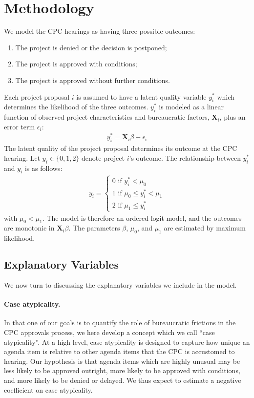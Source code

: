 \section{Methodology}\label{sec_methodology}

We model the CPC hearings as having three possible outcomes:
\begin{enumerate}[start=0]
\item The project is denied or the decision is postponed;
\item The project is approved with conditions;
\item The project is approved without further conditions.
\end{enumerate}
Each project proposal $i$ is assumed to have a latent quality variable $y_i^\ast$ which determines the likelihood of the three outcomes. $y_i^\ast$ is modeled as a linear function of observed project characteristics and bureaucratic factors, $\mathbf{X}_i$, plus an error term $\epsilon_i$:
\begin{align}
y_i^\ast = \mathbf{X}_i \beta + \epsilon_i
\end{align}
The latent quality of the project proposal determines its outcome at the CPC hearing. Let $y_{i} \in \{0, 1, 2\}$ denote project $i$'s outcome. The relationship between $y_i^\ast$ and $y_i$ is as follows:
\begin{align}
y_i = \begin{cases}
0 \text{ if } y_i^\ast < \mu_0 \\
1 \text{ if } \mu_0 \leq y_i^\ast < \mu_1 \\
2 \text{ if } \mu_1 \leq y_i^\ast
\end{cases}
\end{align}
with $\mu_0 < \mu_1$. The model is therefore an ordered logit model, and the outcomes are monotonic in $\mathbf{X}_i \beta$. The parameters $\beta$, $\mu_0$, and $\mu_1$ are estimated by maximum likelihood.

\subsection{Explanatory Variables}

We now turn to discussing the explanatory variables we include in the model.

\paragraph{Case atypicality.} In that one of our goals is to quantify the role of bureaucratic frictions in the CPC approvals process, we here develop a concept which we call ``case atypicality''. At a high level, case atypicality is designed to capture how unique an agenda item is relative to other agenda items that the CPC is accustomed to hearing. Our hypothesis is that agenda items which are highly unusual may be less likely to be approved outright, more likely to be approved with conditions, and more likely to be denied or delayed. We thus expect to estimate a negative coefficient on case atypicality.

